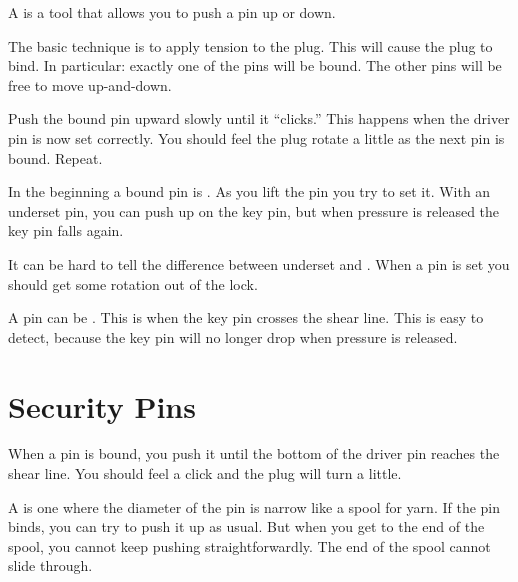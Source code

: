 \documentclass[11pt, oneside]{amsart}
\begin{document}
\begin{definition}
  A  is a tool that allows you to push a pin up or
  down.
\end{definition}

\begin{proposition}
  The basic technique is to apply tension to the plug. This will cause
  the plug to bind. In particular: exactly one of the pins will be
  bound. The other pins will be free to move up-and-down.

  Push the bound pin upward slowly until it ``clicks.'' This happens
  when the driver pin is now set correctly. You should feel the plug
  rotate a little as the next pin is bound. Repeat.
\end{proposition}

\begin{proposition}
  In the beginning a bound pin is . As you lift the pin
  you try to set it. With an underset pin, you can push up on the key
  pin, but when pressure is released the key pin falls again.

  It can be hard to tell the difference between underset and
  . When a pin is set you should get some rotation out of
  the lock.
\end{proposition}

\begin{proposition}
  A pin can be . This is when the key pin crosses the
  shear line. This is easy to detect, because the key pin will no longer
  drop when pressure is released.
\end{proposition}

\section{Security Pins}

\begin{proposition}
  When a pin is bound, you push it until the bottom of the driver pin
  reaches the shear line. You should feel a click and the plug will turn
  a little.
\end{proposition}

\begin{definition}
  A  is one where the diameter of the pin is narrow
  like a spool for yarn. If the pin binds, you can try to push it up as
  usual. But when you get to the end of the spool, you cannot keep
  pushing straightforwardly. The end of the spool cannot slide through.
\end{definition}
\end{document}

